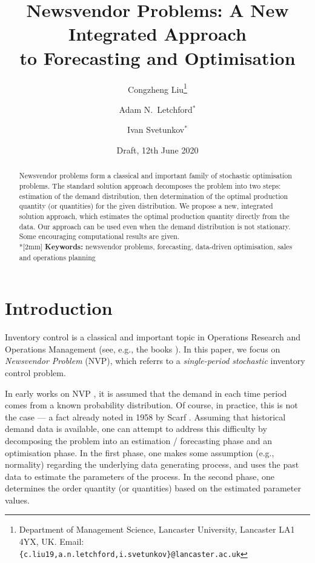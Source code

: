 \documentclass{article}
\title{Newsvendor Problems: A New Integrated Approach\\ to Forecasting and Optimisation}
\author{Congzheng Liu\thanks{Department of Management Science,
Lancaster University, Lancaster LA1 4YX, UK.
Email: {\tt \{c.liu19,a.n.letchford,i.svetunkov\}@lancaster.ac.uk}}
\and Adam N.\ Letchford$^*$ \and Ivan Svetunkov$^*$} %
\date{Draft, 12th June 2020}
\begin{document}
\maketitle

\begin{abstract}
Newsvendor problems form a classical and important family of stochastic optimisation problems. The standard solution approach decomposes the problem into two steps: estimation of the demand distribution, then determination of the optimal production quantity (or quantities) for the given distribution. We propose a new, integrated solution approach, which estimates the optimal production quantity directly from the data. Our approach can be used even when the demand distribution is not stationary. Some encouraging computational results are given. 
\\*[2mm]
{\bf Keywords:} newsvendor problems, forecasting, data-driven optimisation, sales and operations planning
\end{abstract}


\section{Introduction}

Inventory control is a classical and important topic in Operations Research and Operations Management (see, e.g., the books \cite{Po02,SPP98,Zi00}). In this paper, we focus on \emph{Newsvendor Problem} (NVP), which referrs to a \emph{single-period} \emph{stochastic} inventory control problem.

In early works on NVP \cite{AHM51,MK51}, it is assumed that the demand in each time period comes from a known probability distribution. Of course, in practice, this is not the case --- a fact already noted in 1958 by Scarf \cite{Sc58}. Assuming that historical demand data is available, one can attempt to address this difficulty by decomposing the problem into an estimation / forecasting phase and an optimisation phase.
In the first phase, one makes some assumption (e.g., normality) regarding the underlying data generating process, and uses the past data to estimate the parameters of the process.
In the second phase, one determines the order quantity (or quantities) based on the estimated parameter values.
\end{document}
